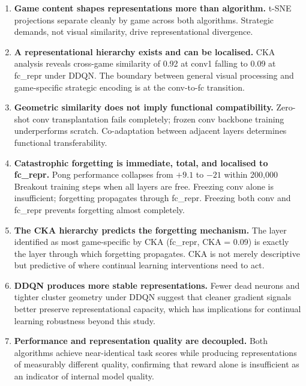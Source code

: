 \documentclass[a4paper]{article}
\begin{document}
\begin{enumerate}
    \item \textbf{Game content shapes representations more than algorithm.} t-SNE projections separate cleanly by game across both algorithms. Strategic demands, not visual similarity, drive representational divergence.

    \item \textbf{A representational hierarchy exists and can be localised.} CKA analysis reveals cross-game similarity of 0.92 at conv1 falling to 0.09 at fc\_repr under DDQN. The boundary between general visual processing and game-specific strategic encoding is at the conv-to-fc transition.

    \item \textbf{Geometric similarity does not imply functional compatibility.} Zero-shot conv transplantation fails completely; frozen conv backbone training underperforms scratch. Co-adaptation between adjacent layers determines functional transferability.

    \item \textbf{Catastrophic forgetting is immediate, total, and localised to fc\_repr.} Pong performance collapses from $+9.1$ to $-21$ within 200,000 Breakout training steps when all layers are free. Freezing conv alone is insufficient; forgetting propagates through fc\_repr. Freezing both conv and fc\_repr prevents forgetting almost completely.

    \item \textbf{The CKA hierarchy predicts the forgetting mechanism.} The layer identified as most game-specific by CKA (fc\_repr, CKA = 0.09) is exactly the layer through which forgetting propagates. CKA is not merely descriptive but predictive of where continual learning interventions need to act.

    \item \textbf{DDQN produces more stable representations.} Fewer dead neurons and tighter cluster geometry under DDQN suggest that cleaner gradient signals better preserve representational capacity, which has implications for continual learning robustness beyond this study.

    \item \textbf{Performance and representation quality are decoupled.} Both algorithms achieve near-identical task scores while producing representations of measurably different quality, confirming that reward alone is insufficient as an indicator of internal model quality.
\end{enumerate}
\end{document}
